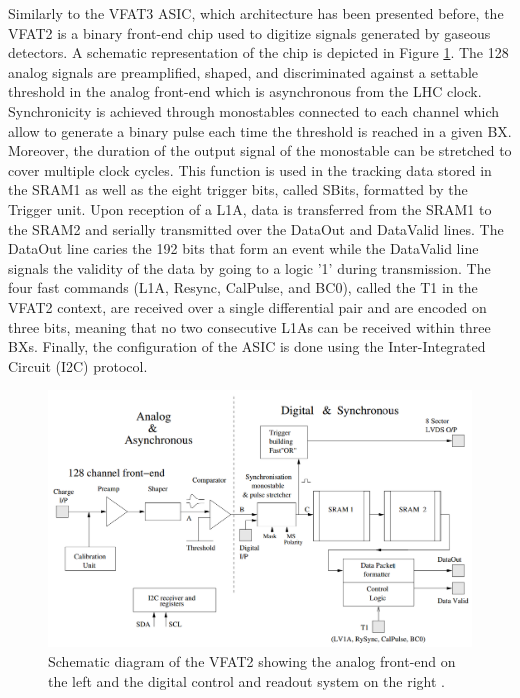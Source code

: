       Similarly to the VFAT3 ASIC, which architecture has been presented before, the VFAT2 is a binary front-end chip used to digitize signals generated by gaseous detectors. A schematic representation of the chip is depicted in Figure \ref{fig:II-2-vfat2}. The 128 analog signals are preamplified, shaped, and discriminated against a settable threshold in the analog front-end which is asynchronous from the LHC clock. Synchronicity is achieved through monostables connected to each channel which allow to generate a binary pulse each time the threshold is reached in a given BX. Moreover, the duration of the output signal of the monostable can be stretched to cover multiple clock cycles. This function is used in the tracking data stored in the SRAM1 as well as the eight trigger bits, called SBits, formatted by the Trigger unit. Upon reception of a L1A, data is transferred from the SRAM1 to the SRAM2 and serially transmitted over the DataOut and DataValid lines. The DataOut line caries the 192 bits that form an event while the DataValid line signals the validity of the data by going to a logic '1' during transmission. The four fast commands (L1A, Resync, CalPulse, and BC0), called the T1 in the VFAT2 context, are received over a single differential pair and are encoded on three bits, meaning that no two consecutive L1As can be received within three BXs. Finally, the configuration of the ASIC is done using the Inter-Integrated Circuit (I2C) protocol. \\

      \begin{figure}[h!]
        \centering
        \includegraphics[width=\textwidth]{img/II-2-daq/vfat2.png}
        \caption{Schematic diagram of the VFAT2 showing the analog front-end on the left and the digital control and readout system on the right \cite{Aspell:1069906}.}
        \label{fig:II-2-vfat2}
      \end{figure}

